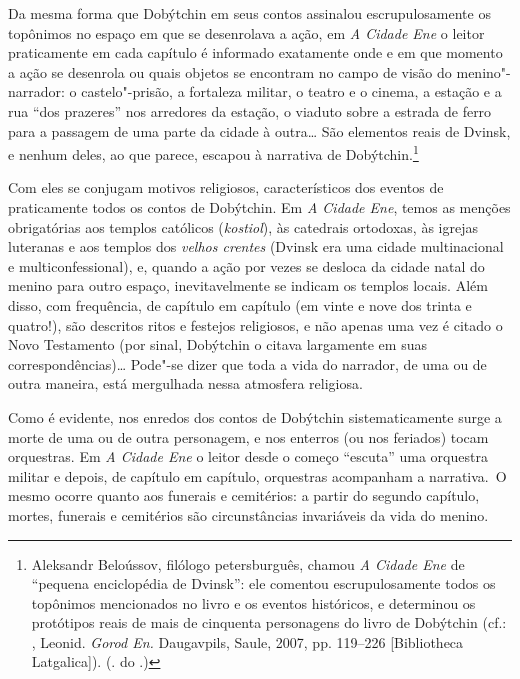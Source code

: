 Da mesma forma que Dobýtchin em seus contos assinalou escrupulosamente
os topônimos no espaço em que se desenrolava a ação, em \emph{A Cidade
Ene} o leitor praticamente em cada capítulo é informado exatamente onde
e em que momento a ação se desenrola ou quais objetos se encontram no
campo de visão do menino"-narrador: o castelo"-prisão, a fortaleza
militar, o teatro e o cinema, a estação e a rua ``dos prazeres'' nos
arredores da estação, o viaduto sobre a estrada de ferro para a passagem
de uma parte da cidade à outra\ldots{} São elementos reais de Dvinsk, e
nenhum deles, ao que parece, escapou à narrativa de Dobýtchin.\footnote{Aleksandr
  Beloússov, filólogo petersburguês, chamou \emph{A Cidade Ene} de
  ``pequena enciclopédia de Dvinsk'': ele comentou escrupulosamente
  todos os topônimos mencionados no livro e os eventos históricos, e
  determinou os protótipos reais de mais de cinquenta personagens do
  livro de Dobýtchin (cf.: \scalebox{.8}{DOBÝTCHIN}, Leonid. \emph{Gorod En.}
  Daugavpils, Saule, 2007, pp. 119--226 [Bibliotheca Latgalica]). (\scalebox{.8}{N}. do
  \scalebox{.8}{A}.)}

Com eles se conjugam motivos religiosos, característicos dos eventos de
praticamente todos os contos de Dobýtchin. Em \emph{A Cidade Ene}, temos
as menções obrigatórias aos templos católicos (\emph{kostiol}), às
catedrais ortodoxas, às igrejas luteranas e aos templos dos \emph{velhos
crentes} (Dvinsk era uma cidade multinacional e multiconfessional), e,
quando a ação por vezes se desloca da cidade natal do menino para outro
espaço, inevitavelmente se indicam os templos locais. Além disso, com
frequência, de capítulo em capítulo (em vinte e nove dos trinta e
quatro!), são descritos ritos e festejos religiosos, e não apenas uma
vez é citado o Novo Testamento (por sinal, Dobýtchin o citava largamente
em suas correspondências)\ldots{} Pode"-se dizer que toda a vida do narrador,
de uma ou de outra maneira, está mergulhada nessa atmosfera religiosa.

Como é evidente, nos enredos dos contos de Dobýtchin sistematicamente
surge a morte de uma ou de outra personagem, e nos enterros (ou nos
feriados) tocam orquestras. Em \emph{A Cidade Ene} o leitor desde o
começo ``escuta'' uma orquestra militar e depois, de capítulo em
capítulo, orquestras acompanham a narrativa.~O mesmo ocorre quanto aos
funerais e cemitérios: a partir do segundo capítulo, mortes, funerais e
cemitérios são circunstâncias invariáveis da vida do menino.

